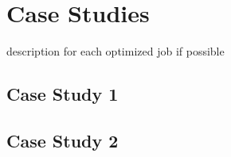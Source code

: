 \section{Case Studies}

description for each optimized job if possible

\subsection{Case Study 1}


\subsection{Case Study 2}
